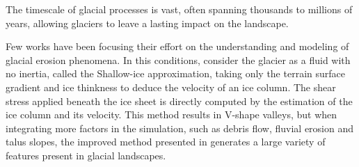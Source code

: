 The timescale of glacial processes is vast, often spanning thousands to millions of years, allowing glaciers to leave a lasting impact on the landscape.

Few works have been focusing their effort on the understanding and modeling of glacial erosion phenomena. In this conditions, \cite{Argudo2020} consider the glacier as a fluid with no inertia, called the Shallow-ice approximation, taking only the terrain surface gradient and ice thinkness to deduce the velocity of an ice column. The shear stress applied beneath the ice sheet is directly computed by the estimation of the ice column and its velocity. This method results in V-shape valleys, but when integrating more factors in the simulation, such as debris flow, fluvial erosion and talus slopes, the improved method presented in \cite{Cordonnier2023} generates a large variety of features present in glacial landscapes.





